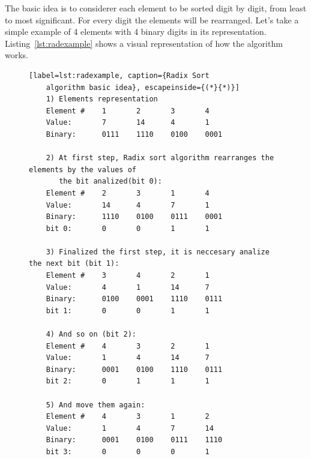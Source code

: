 \documentclass[Ingles]{ic-tese-v1}
\newcommand{\rlst}[1]{Listing~\ref{lst:#1}}
\begin{document}
The basic idea is to considerer each element to be sorted digit by digit, from
least to most significant. For every digit the elements will be rearranged.
Let’s take a simple example of 4 elements with 4 binary digits in its
representation. \rlst{radexample} shows a visual representation of how the
algorithm works.

\begin{figure}[t]
	\lstset{basicstyle=\scriptsize}
	\begin{lstlisting}[label=lst:radexample, caption={Radix Sort
	algorithm basic idea}, escapeinside={(*}{*)}]
	1) Elements representation
	Element #    1       2       3       4
	Value:       7       14      4       1
	Binary:      0111    1110    0100    0001

	2) At first step, Radix sort algorithm rearranges the elements by the values of
	   the bit analized(bit 0):
	Element #    2       3       1       4
	Value:       14      4       7       1
	Binary:      1110    0100    0111    0001
	bit 0:       0       0       1       1

	3) Finalized the first step, it is neccesary analize the next bit (bit 1):
	Element #    3       4       2       1
	Value:       4       1       14      7
	Binary:      0100    0001    1110    0111
	bit 1:       0       0       1       1

	4) And so on (bit 2):
	Element #    4       3       2       1
	Value:       1       4       14      7
	Binary:      0001    0100    1110    0111
	bit 2:       0       1       1       1

	5) And move them again:
	Element #    4       3       1       2
	Value:       1       4       7       14
	Binary:      0001    0100    0111    1110
	bit 3:       0       0       0       1

	\end{lstlisting}
\end{figure}
\end{document}
